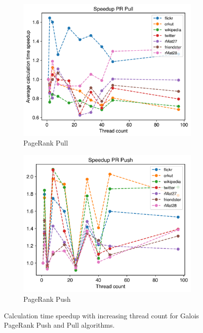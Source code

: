 \begin{figure}
	\begin{subfigure}{\columnwidth}
		\includegraphics[width=\linewidth]{../../plots/singleNodePRPullGaloisThreads.png}
		\caption{PageRank Pull}
		\label{fig:galoisSpeedupPRPull}
	\end{subfigure}
	\begin{subfigure}{\columnwidth}
		\includegraphics[width=\linewidth]{../../plots/singleNodePRPushGaloisThreads.png}
		\caption{PageRank Push}
		\label{fig:galoisSpeedupPRPush}
	\end{subfigure}
	\caption{Calculation time speedup with increasing thread count for Galois PageRank Push and Pull algorithms.}
\end{figure}

